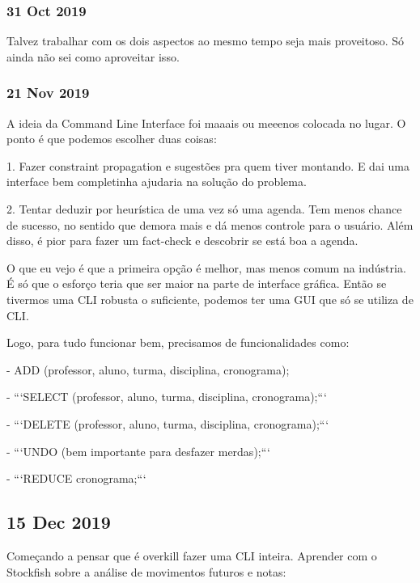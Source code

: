 \documentclass{article}
\begin{document}
\subsubsection{31 Oct 2019}

Talvez trabalhar com os dois aspectos ao mesmo tempo seja mais proveitoso. Só ainda não sei como aproveitar isso.

\subsubsection{21 Nov 2019}

\par A ideia da Command Line Interface foi maaais ou meeenos colocada no lugar. O ponto é que podemos escolher duas coisas:

1. Fazer constraint propagation e sugestões pra quem tiver montando. E dai uma interface bem completinha ajudaria na solução do problema.

2. Tentar deduzir por heurística de uma vez só uma agenda. Tem menos chance de sucesso, no sentido que demora mais e dá menos controle para o usuário. Além disso, é pior para fazer um fact-check e descobrir se está boa a agenda.

\par O que eu vejo é que a primeira opção é melhor, mas menos comum na indústria. É só que o esforço teria que ser maior na parte
de interface gráfica. Então se tivermos uma CLI robusta o suficiente, podemos ter uma GUI que só se utiliza de CLI.

\par Logo, para tudo funcionar bem, precisamos de funcionalidades como:

-     ADD  (professor, aluno, turma, disciplina, cronograma);

- ```SELECT (professor, aluno, turma, disciplina, cronograma);```

- ```DELETE (professor, aluno, turma, disciplina, cronograma);```

- ```UNDO (bem importante para desfazer merdas);```

- ```REDUCE cronograma;```


\subsection{15 Dec 2019}

\par Começando a pensar que é overkill fazer uma CLI inteira.
Aprender com o Stockfish sobre a análise de movimentos futuros e notas:
\end{document}
